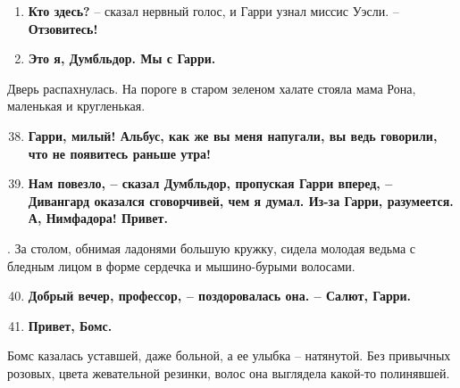 \documentclass[12pt]{article}
\begin{document}
\begin{flushleft}
{\begin{minipage}[0]{540pt}
	
\begin{enumerate}
\parsep=-10pt
\setcounter{enumi}{35}
\vspace*{-10pt}\item
\textbf{Кто здесь?} – сказал нервный голос, и Гарри узнал миссис Уэсли. – \textbf{Отзовитесь!}
\vspace*{-10pt}\item
\textbf{Это я, Думбльдор. Мы с Гарри.}
\end{enumerate}
\vspace*{-10pt}
\hspace{3mm}Дверь распахнулась. На пороге в старом зеленом халате стояла мама Рона, маленькая и кругленькая. 
\begin{enumerate}
\setcounter{enumi}{37}
\vspace*{-10pt}\item
\textbf{Гарри, милый! Альбус, как же вы меня напугали, вы ведь говорили, что не появитесь раньше утра!}
\vspace*{-10pt}\item
\textbf{Нам повезло, \textnormal{– сказал Думбльдор, пропуская Гарри вперед, –} Дивангард оказался сговорчивей, чем я думал. Из-за Гарри, разумеется. А, Нимфадора! Привет.}
\end{enumerate}
\vspace*{-10pt}
\hspace{3mm}. За столом, обнимая ладонями большую кружку, сидела молодая ведьма с бледным лицом в форме сердечка и мышино-бурыми волосами. 
\begin{enumerate}
\setcounter{enumi}{39}
\vspace*{-10pt}\item
\textbf{Добрый вечер, профессор, \textnormal{– поздоровалась она. –} Салют, Гарри.}
\vspace*{-10pt}\item
\textbf{Привет, Бомс.}
\end{enumerate}
\vspace*{-10pt}
\hspace{3mm}Бомс казалась уставшей, даже больной, а ее улыбка – натянутой. Без привычных розовых, цвета жевательной резинки, волос она выглядела какой-то полинявшей.
\end{minipage}}
\end{flushleft}
\end{document}
